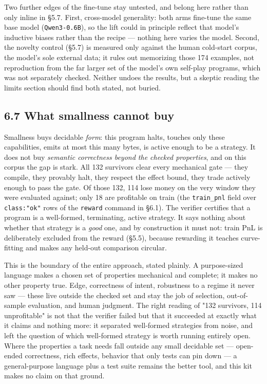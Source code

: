 \documentclass[11pt]{article}
\newcommand{\code}[1]{\texttt{#1}}
\begin{document}
Two further edges of the fine-tune stay untested, and belong here rather than
only inline in \S{}5.7. First, cross-model generality: both arms fine-tune the same
base model (\code{Qwen3-0.6B}), so the lift could in principle reflect that model's
inductive biases rather than the recipe --- nothing here varies the model. Second,
the novelty control (\S{}5.7) is measured only against the human cold-start corpus,
the model's sole external data; it rules out memorizing those 174 examples, not
reproduction from the far larger set of the model's own self-play programs, which
was not separately checked. Neither undoes the results, but a skeptic reading the
limits section should find both stated, not buried.

\subsection*{6.7 What smallness cannot buy}

Smallness buys decidable \emph{form}: this program halts, touches only these
capabilities, emits at most this many bytes, is active enough to be a strategy.
It does not buy \emph{semantic correctness beyond the checked properties}, and on
this corpus the gap is stark. All 132 survivors clear every mechanical gate ---
they compile, they provably halt, they respect the effect bound, they trade
actively enough to pass the gate. Of those 132, 114 lose money on the very
window they were evaluated against; only 18 are profitable on train (the
\code{train\_pnl} field over \code{class:"ok"} rows of the \code{reward} command in \S{}6.1). The
verifier certifies that a program is a well-formed, terminating, active
strategy. It says nothing about whether that strategy is a \emph{good} one, and by
construction it must not: train PnL is deliberately excluded from the reward
(\S{}5.5), because rewarding it teaches curve-fitting and makes any held-out
comparison circular.

This is the boundary of the entire approach, stated plainly. A purpose-sized
language makes a chosen set of properties mechanical and complete; it makes no
other property true. Edge, correctness of intent, robustness to a regime it
never saw --- these live outside the checked set and stay the job of selection,
out-of-sample evaluation, and human judgment. The right reading of "132
survivors, 114 unprofitable" is not that the verifier failed but that it
succeeded at exactly what it claims and nothing more: it separated well-formed
strategies from noise, and left the question of which well-formed strategy is
worth running entirely open. Where the properties a task needs fall outside any
small decidable set --- open-ended correctness, rich effects, behavior that only
tests can pin down --- a general-purpose language plus a test suite remains the
better tool, and this kit makes no claim on that ground.
\end{document}
